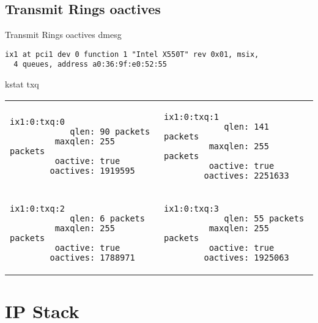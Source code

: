 \documentclass[14pt]{beamer}
\begin{document}
\subsection{Transmit Rings oactives}
\begin{frame}[fragile]{Transmit Rings oactives}
dmesg
\scriptsize
\begin{verbatim}
ix1 at pci1 dev 0 function 1 "Intel X550T" rev 0x01, msix,
  4 queues, address a0:36:9f:e0:52:55
\end{verbatim}
\normalsize
kstat txq
\\
\vspace{.3cm}
\scriptsize
\begin{tabular}{ll}
  \begin{minipage}{4.5cm}
  \begin{verbatim}
ix1:0:txq:0
            qlen: 90 packets
         maxqlen: 255 packets
         oactive: true
        oactives: 1919595
  \end{verbatim}
  \end{minipage}
  &
  \begin{minipage}{4.5cm}
  \begin{verbatim}
ix1:0:txq:1
            qlen: 141 packets
         maxqlen: 255 packets
         oactive: true
        oactives: 2251633
  \end{verbatim}
  \end{minipage}
  \\
  \begin{minipage}{4.5cm}
  \begin{verbatim}
ix1:0:txq:2
            qlen: 6 packets
         maxqlen: 255 packets
         oactive: true
        oactives: 1788971
  \end{verbatim}
  \end{minipage}
  &
  \begin{minipage}{4.5cm}
  \begin{verbatim}
ix1:0:txq:3
            qlen: 55 packets
         maxqlen: 255 packets
         oactive: true
        oactives: 1925063
  \end{verbatim}
  \end{minipage}
  \\
\end{tabular}
\end{frame}

\section{IP Stack}
\end{document}
